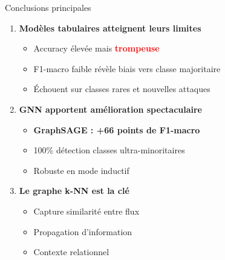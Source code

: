 ﻿\documentclass[aspectratio=169]{beamer}
\begin{document}
\begin{frame}{Conclusions principales}
\begin{enumerate}
    \item \textbf{Modèles tabulaires atteignent leurs limites}
    \begin{itemize}
        \item Accuracy élevée mais \textcolor{red}{\textbf{trompeuse}}
        \item F1-macro faible révèle biais vers classe majoritaire
        \item Échouent sur classes rares et nouvelles attaques
    \end{itemize}
    
    \vspace{0.3cm}
    
    \item \textbf{GNN apportent amélioration spectaculaire}
    \begin{itemize}
        \item \textcolor{accentorange}{\textbf{GraphSAGE : +66 points de F1-macro}}
        \item 100\% détection classes ultra-minoritaires
        \item Robuste en mode inductif
    \end{itemize}
    
    \vspace{0.3cm}
    
    \item \textbf{Le graphe k-NN est la clé}
    \begin{itemize}
        \item Capture similarité entre flux
        \item Propagation d'information
        \item Contexte relationnel
    \end{itemize}
\end{enumerate}
\end{frame}
\end{document}
